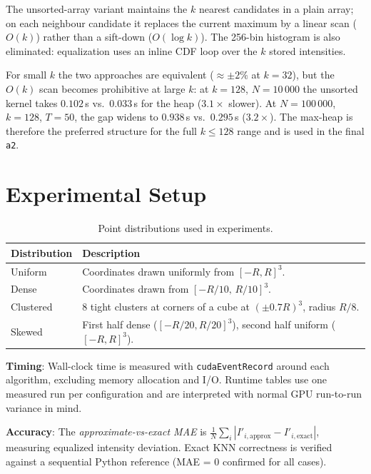 \documentclass[11pt,a4paper]{article}
\begin{document}
The unsorted-array variant maintains the $k$ nearest candidates in a plain
array; on each neighbour candidate it replaces the current maximum by a linear
scan ($O(k)$) rather than a sift-down ($O(\log k)$).  The 256-bin histogram is
also eliminated: equalization uses an inline CDF loop over the $k$ stored
intensities.

For small $k$ the two approaches are equivalent ($\approx\pm2\%$ at $k=32$),
but the $O(k)$ scan becomes prohibitive at large $k$: at $k=128$, $N=10\,000$
the unsorted kernel takes $0.102$\,s vs.\ $0.033$\,s for the heap ($3.1\times$
slower).  At $N=100\,000$, $k=128$, $T=50$, the gap widens to $0.938$\,s
vs.\ $0.295$\,s ($3.2\times$).  The max-heap is therefore the preferred
structure for the full $k \le 128$ range and is used in the final \texttt{a2}.

\section{Experimental Setup}



\begin{table}[H]
\centering
\caption{Point distributions used in experiments.}
\label{tab:dists}
\begin{tabular}{lp{9cm}}
\toprule
Distribution & Description \\
\midrule
Uniform   & Coordinates drawn uniformly from $[-R,R]^3$. \\
Dense     & Coordinates drawn from $[-R/10,\,R/10]^3$. \\
Clustered & 8 tight clusters at corners of a cube at $(\pm 0.7R)^3$, radius $R/8$. \\
Skewed    & First half dense ($[-R/20,R/20]^3$), second half uniform ($[-R,R]^3$). \\
\bottomrule
\end{tabular}
\end{table}

\textbf{Timing}: Wall-clock time is measured with \texttt{cudaEventRecord}
around each algorithm, excluding memory allocation and I/O.
Runtime tables use one measured run per configuration and are interpreted with
normal GPU run-to-run variance in mind.

\textbf{Accuracy}: The \emph{approximate-vs-exact MAE} is
$\frac{1}{N}\sum_i|I'_{i,\text{approx}}-I'_{i,\text{exact}}|$, measuring
equalized intensity deviation.  Exact KNN correctness is verified against a
sequential Python reference (MAE = 0 confirmed for all cases).
\end{document}
